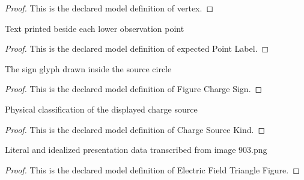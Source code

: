 \begin{proof}
  This is the declared model definition of vertex.
\end{proof}
\begin{definition}
  \label{def:physics:phyx-mini-0903:phyxminiproblems-problemphyxmini0903-expectedpointlabel}
  Text printed beside each lower observation point
\end{definition}
\begin{proof}
  This is the declared model definition of expected Point Label.
\end{proof}
\begin{definition}
  \label{def:physics:phyx-mini-0903:phyxminiproblems-problemphyxmini0903-figurechargesign}
  The sign glyph drawn inside the source circle
\end{definition}
\begin{proof}
  This is the declared model definition of Figure Charge Sign.
\end{proof}
\begin{definition}
  \label{def:physics:phyx-mini-0903:phyxminiproblems-problemphyxmini0903-chargesourcekind}
  Physical classification of the displayed charge source
\end{definition}
\begin{proof}
  This is the declared model definition of Charge Source Kind.
\end{proof}
\begin{definition}
  \label{def:physics:phyx-mini-0903:phyxminiproblems-problemphyxmini0903-electricfieldtrianglefigure}
  Literal and idealized presentation data transcribed from image 903.png
\end{definition}
\begin{proof}
  This is the declared model definition of Electric Field Triangle Figure.
\end{proof}
